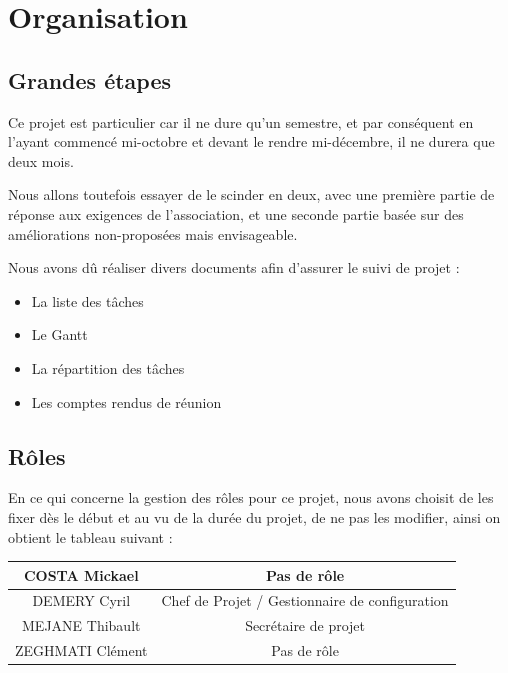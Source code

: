 \documentclass[11pt]{report}
\begin{document}
\section{Organisation}
\subsection{Grandes étapes}
Ce projet est particulier car il ne dure qu'un semestre, et par conséquent en 
l'ayant commencé mi-octobre et devant le rendre mi-décembre, il ne durera que 
deux mois. \\
\par Nous allons toutefois essayer de le scinder en deux, avec une première 
partie de réponse aux exigences de l’association, et une seconde partie basée 
sur des améliorations non-proposées mais envisageable.

Nous avons dû réaliser divers documents afin d'assurer le suivi de projet : 
\begin{itemize}
    \item La liste des tâches
    \item Le Gantt
    \item La répartition des tâches
    \item Les comptes rendus de réunion \\
\end{itemize}

\subsection{Rôles}
En ce qui concerne la gestion des rôles pour ce projet, nous avons choisit de 
les fixer dès le début et au vu de la durée du projet, de ne pas les modifier, 
ainsi on obtient le tableau suivant :  
\par
\begin{tabular}{ | c | c | }
\hline 
   COSTA Mickael & Pas de rôle  \\ \hline 
   DEMERY Cyril & Chef de Projet / Gestionnaire de configuration \\ \hline 
   MEJANE Thibault & Secrétaire de projet \\ \hline 
   ZEGHMATI Clément & Pas de rôle \\ \hline
 \end{tabular}
\end{document}
